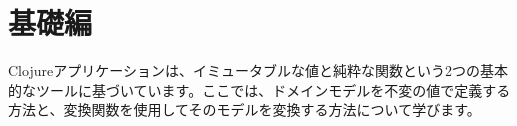 \part{基礎編}

Clojureアプリケーションは、イミュータブルな値と純粋な関数という2つの基本的なツールに基づいています。ここでは、ドメインモデルを不変の値で定義する方法と、変換関数を使用してそのモデルを変換する方法について学びます。





